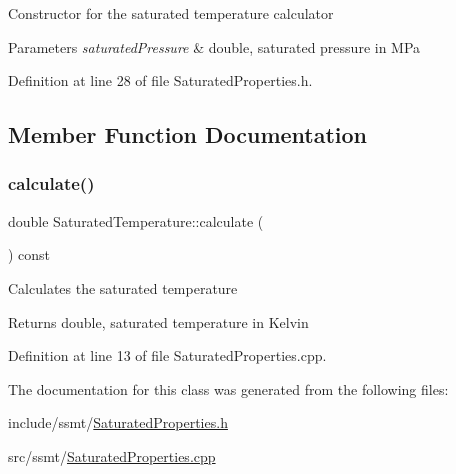 Constructor for the saturated temperature calculator 
\begin{DoxyParams}{Parameters}
{\em saturated\+Pressure} & double, saturated pressure in M\+Pa \\
\hline
\end{DoxyParams}


Definition at line 28 of file Saturated\+Properties.\+h.



\subsection{Member Function Documentation}
\mbox{\label{class_saturated_temperature_a4aa0d2a337289dd36f4e063f1f67aaa5}} 
\subsubsection{\texorpdfstring{calculate()}{calculate()}}
{\footnotesize\ttfamily double Saturated\+Temperature\+::calculate (\begin{DoxyParamCaption}{ }\end{DoxyParamCaption}) const}

Calculates the saturated temperature \begin{DoxyReturn}{Returns}
double, saturated temperature in Kelvin 
\end{DoxyReturn}


Definition at line 13 of file Saturated\+Properties.\+cpp.



The documentation for this class was generated from the following files\+:\begin{DoxyCompactItemize}
\item 
include/ssmt/\hyperlink{_saturated_properties_8h}{Saturated\+Properties.\+h}\item 
src/ssmt/\hyperlink{_saturated_properties_8cpp}{Saturated\+Properties.\+cpp}\end{DoxyCompactItemize}
